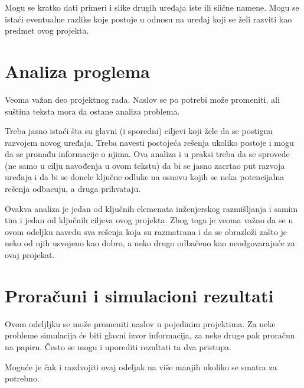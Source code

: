 \documentclass[a4paper, 12pt]{article}
\begin{document}
\vspace{10pt}

Mogu se kratko dati primeri i slike drugih uređaja iste ili slične namene. Mogu se istaći eventualne razlike koje postoje u odnosu na uređaj koji se želi razviti kao predmet ovog projekta.

\pagebreak

\section{Analiza proglema}

\vspace{10pt}

Veoma važan deo projektnog rada. Naslov se po potrebi može promeniti, ali suština teksta mora da ostane analiza problema.

\vspace{10pt}

Treba jasno istaći šta su glavni (i sporedni) ciljevi koji žele da se postignu razvojem novog uređaja. Treba navesti postojeća rešenja ukoliko postoje i mogu da se pronađu informacije o njima. Ova analiza i u praksi treba da se sprovede (ne samo u cilju navođenja u ovom tekstu) da bi se jasno zacrtao put razvoja uređaja i da bi se donele ključne odluke na osnovu kojih se neka potencijalna rešenja odbacuju, a druga prihvataju.

\vspace{10pt}

Ovakva analiza je jedan od ključnih elemenata inženjerskog razmišljanja i samim tim i jedan od ključnih ciljeva ovog projekta. Zbog toga je veoma važno da se u ovom odeljku navedu sva rešenja koja su razmatrana i da se obrazloži zašto je neko od njih usvojeno kao dobro, a neko drugo odbačeno kao neodgovarajuće za ovaj projekat.
\pagebreak

\section{Proračuni i simulacioni rezultati}

\vspace{10pt}

Ovom odeljljku se može promeniti naslov u pojedinim projektima. Za neke probleme simulacija će biti glavni izvor informacija, za neke druge pak proračun na papiru. Često se mogu i uporediti rezultati ta dva pristupa.

\vspace{10pt}

Moguće je čak i razdvojiti ovaj odeljak na više manjih ukoliko se smatra za potrebno.
\end{document}
